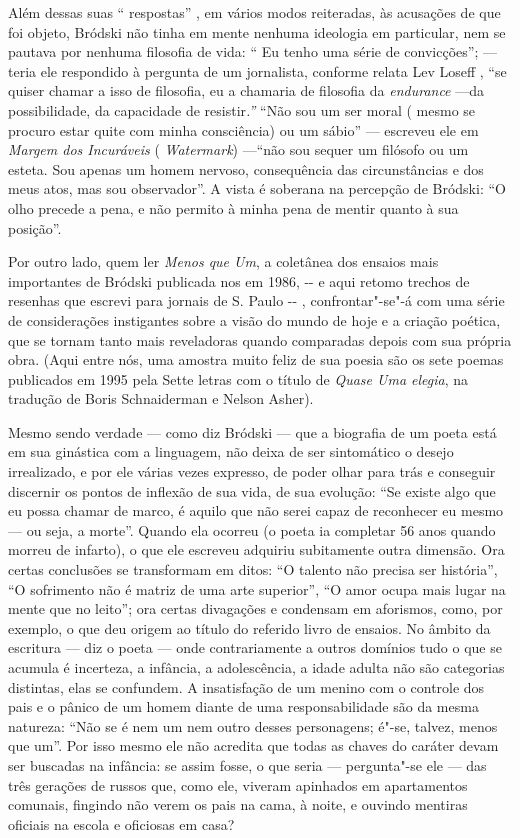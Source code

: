Além dessas suas `` respostas'' , em vários modos reiteradas, às
acusações de que foi objeto, Bródski não tinha em mente nenhuma
ideologia em particular, nem se pautava por nenhuma filosofia de vida:
`` Eu tenho uma série de convicções''; --- teria ele respondido à
pergunta de um jornalista, conforme relata Lev Loseff , ``se quiser
chamar a isso de filosofia, eu a chamaria de filosofia da
\emph{endurance} ---da possibilidade, da capacidade de resistir\emph{.''}
``Não sou um ser moral ( mesmo se procuro estar quite com minha
consciência) ou um sábio'' --- escreveu ele em \emph{Margem dos
Incuráveis} ( \emph{Watermark}) ---``não sou sequer um filósofo ou um
esteta. Sou apenas um homem nervoso, consequência das circunstâncias e
dos meus atos, mas sou observador''. A vista é soberana na percepção de
Bródski: ``O olho precede a pena, e não permito à minha pena de mentir
quanto à sua posição''.

Por outro lado, quem ler \emph{Menos que Um}, a coletânea dos ensaios
mais importantes de Bródski publicada nos  em 1986, -\/- e aqui
retomo trechos de resenhas que escrevi para jornais de S. Paulo -\/- ,
confrontar"-se"-á com uma série de considerações instigantes sobre a visão
do mundo de hoje e a criação poética, que se tornam tanto mais
reveladoras quando comparadas depois com sua própria obra. (Aqui entre
nós, uma amostra muito feliz de sua poesia são os sete poemas publicados
em 1995 pela Sette letras com o título de \emph{Quase Uma elegia}, na
tradução de Boris Schnaiderman e Nelson Asher).

Mesmo sendo verdade --- como diz Bródski --- que a biografia de um poeta
está em sua ginástica com a linguagem, não deixa de ser sintomático o
desejo irrealizado, e por ele várias vezes expresso, de poder olhar para
trás e conseguir discernir os pontos de inflexão de sua vida, de sua
evolução: ``Se existe algo que eu possa chamar de marco, é aquilo que
não serei capaz de reconhecer eu mesmo --- ou seja, a morte''. Quando ela
ocorreu (o poeta ia completar 56 anos quando morreu de infarto), o que
ele escreveu adquiriu subitamente outra dimensão. Ora certas conclusões
se transformam em ditos: ``O talento não precisa ser história'', ``O
sofrimento não é matriz de uma arte superior'', ``O amor ocupa mais
lugar na mente que no leito''; ora certas divagações e condensam em
aforismos, como, por exemplo, o que deu origem ao título do referido
livro de ensaios. No âmbito da escritura --- diz o poeta --- onde
contrariamente a outros domínios tudo o que se acumula é incerteza, a
infância, a adolescência, a idade adulta não são categorias distintas,
elas se confundem. A insatisfação de um menino com o controle dos pais e
o pânico de um homem diante de uma responsabilidade são da mesma
natureza: ``Não se é nem um nem outro desses personagens; é"-se, talvez,
menos que um''. Por isso mesmo ele não acredita que todas as chaves do
caráter devam ser buscadas na infância: se assim fosse, o que seria ---
pergunta"-se ele --- das três gerações de russos que, como ele, viveram
apinhados em apartamentos comunais, fingindo não verem os pais na cama,
à noite, e ouvindo mentiras oficiais na escola e oficiosas em casa?

